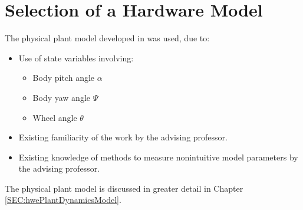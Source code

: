 \documentclass[crop=false,float=true,class=scrreprt]{standalone}
\begin{document}
\section{Selection of a Hardware Model}
\label{SEC:preliminaryDecisions:selectionHardwareModel}

The physical plant model developed in
\textcite{REF:online:2009-yamamoto}
was used, due to:

\begin{itemize}[leftmargin=*]

\item Use of state variables involving:
\begin{itemize}[leftmargin=*]

  \item Body pitch angle $\alpha$
  
  \item Body yaw angle $\Psi$
  
  \item Wheel angle $\theta$

\end{itemize} 

\item Existing familiarity of the work by the advising professor.

\item Existing knowledge of methods to measure nonintuitive model parameters by the advising professor.

\end{itemize}


The physical plant model is discussed in greater detail in Chapter~%
\ref{SEC:hwePlantDynamicsModel}.




\clearpage
\end{document}
